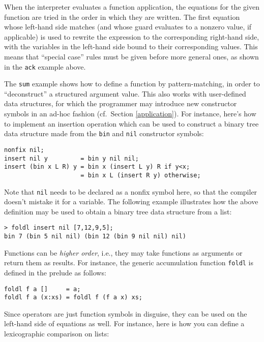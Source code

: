 \documentclass[a4paper,12pt]{article}
\begin{document}
When the interpreter evaluates a function application, the equations for the given function are tried in the order in which they are written. The first equation whose left-hand side matches (and whose guard evaluates to a nonzero value, if applicable) is used to rewrite the expression to the corresponding right-hand side, with the variables in the left-hand side bound to their corresponding values. This means that ``special case'' rules must be given before more general ones, as shown in the \verb|ack| example above.

The \verb|sum| example shows how to define a function by pattern-matching, in order to ``deconstruct'' a structured argument value. This also works with user-defined data structures, for which the programmer may introduce new constructor symbols in an ad-hoc fashion (cf.\ Section \ref{application}). For instance, here's how to implement an insertion operation which can be used to construct a binary tree data structure made from the \verb|bin| and \verb|nil| constructor symbols:

\begin{lstlisting}
nonfix nil;
insert nil y         = bin y nil nil;
insert (bin x L R) y = bin x (insert L y) R if y<x;
                     = bin x L (insert R y) otherwise;
\end{lstlisting}

Note that \verb|nil| needs to be declared as a nonfix symbol here, so that the compiler doesn't mistake it for a variable. The following example illustrates how the above definition may be used to obtain a binary tree data structure from a list:

\begin{lstlisting}
> foldl insert nil [7,12,9,5];
bin 7 (bin 5 nil nil) (bin 12 (bin 9 nil nil) nil)
\end{lstlisting}

Functions can be \emph{higher order}, i.e., they may take functions as arguments or return them as results. For instance, the generic accumulation function \verb|foldl| is defined in the prelude as follows:

\begin{lstlisting}
foldl f a []     = a;
foldl f a (x:xs) = foldl f (f a x) xs;
\end{lstlisting}

Since operators are just function symbols in disguise, they can be used on the left-hand side of equations as well. For instance, here is how you can define a lexicographic comparison on lists:
\end{document}
